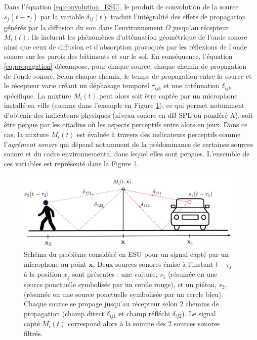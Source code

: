 Dans l'équation \ref{eq:convolution_ESU}, le produit de convolution de la source $s_j(t-\tau_j)$ par la variable $\delta_{ij}(t)$ traduit l'intégralité des effets de propagation générés par la diffusion du son dans l'environnement $\Omega$ jusqu'au récepteur $M_i(t)$. Ils incluent les phénomènes d'atténuation géométrique de l'onde sonore ainsi que ceux de diffusion et d'absorption provoqués par les réflexions de l'onde sonore sur les parois des bâtiments et sur le sol.
En conséquence, l'équation \ref{eq:propagation} décompose, pour chaque source, chaque chemin de propagation de l'onde sonore. Selon chaque chemin, le temps de propagation entre la source et le récepteur varie créant un déphasage temporel $\tau_{ijk}$ et une atténuation $\delta_{ijk}$ spécifique. 
La mixture $M_{i}(t)$ peut alors soit être captée par un microphone installé en ville (comme dans l'exemple en Figure \ref{fig:schema_ville}), ce qui permet notamment d'obtenir des indicateurs physiques (niveau sonore en dB SPL ou pondéré A), soit être perçue par les citadins où les aspects perceptifs entre alors en jeux. Dans ce cas, la mixture $M_{i}(t)$ est évaluée à travers des indicateurs perceptifs comme l'\textit{agrément sonore} qui dépend notamment de la prédominance de certaines sources sonore et du cadre environnemental dans lequel elles sont perçues. L'ensemble de ces variables est représenté dans la Figure \ref{fig:schema_ville}. 

\begin{figure}[hbtp]
\centering
\includegraphics[width=.9\linewidth]{./figures/autres/schema_ville_propa.pdf}
\caption{Schéma du problème considéré en ESU pour un signal capté par un microphone au point $\mathbf{x}$. Deux sources sonores émise à l'instant $t-\tau_{j}$ à la position $x_j$ sont présentes : une voiture, $s_{1}$ (résumée en une source ponctuelle symbolisée par un cercle rouge), et un piéton, $s_2$, (résumée en une source ponctuelle symbolisée par un cercle bleu). Chaque source se propage jusqu'au récepteur selon 2 chemins de propagation (champ direct $\delta_{ij1}$ et champ réfléchi $\delta_{ij2}$). Le signal capté $M_{i}(t)$ correspond alors à la somme des 2 sources sonores filtrés.}
\label{fig:schema_ville}
\end{figure}

